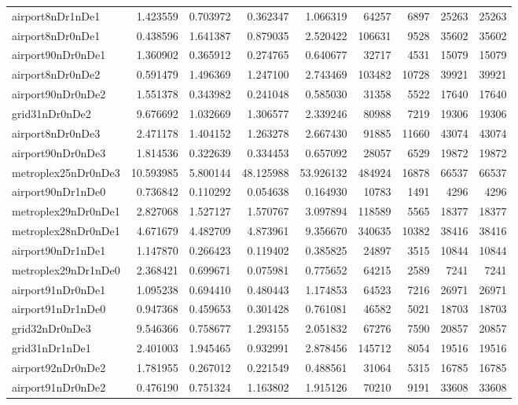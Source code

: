 \begin{longtable}{|l|r|r|r|r|r|r|r|r|}
airport8nDr1nDe1 & 1.423559 & 0.703972 & 0.362347 & 1.066319 & 64257 & 6897 & 25263 & 25263 \\
airport8nDr0nDe1 & 0.438596 & 1.641387 & 0.879035 & 2.520422 & 106631 & 9528 & 35602 & 35602 \\
airport90nDr0nDe1 & 1.360902 & 0.365912 & 0.274765 & 0.640677 & 32717 & 4531 & 15079 & 15079 \\
airport8nDr0nDe2 & 0.591479 & 1.496369 & 1.247100 & 2.743469 & 103482 & 10728 & 39921 & 39921 \\
airport90nDr0nDe2 & 1.551378 & 0.343982 & 0.241048 & 0.585030 & 31358 & 5522 & 17640 & 17640 \\
grid31nDr0nDe2 & 9.676692 & 1.032669 & 1.306577 & 2.339246 & 80988 & 7219 & 19306 & 19306 \\
airport8nDr0nDe3 & 2.471178 & 1.404152 & 1.263278 & 2.667430 & 91885 & 11660 & 43074 & 43074 \\
airport90nDr0nDe3 & 1.814536 & 0.322639 & 0.334453 & 0.657092 & 28057 & 6529 & 19872 & 19872 \\
metroplex25nDr0nDe3 & 10.593985 & 5.800144 & 48.125988 & 53.926132 & 484924 & 16878 & 66537 & 66537 \\
airport90nDr1nDe0 & 0.736842 & 0.110292 & 0.054638 & 0.164930 & 10783 & 1491 & 4296 & 4296 \\
metroplex29nDr0nDe1 & 2.827068 & 1.527127 & 1.570767 & 3.097894 & 118589 & 5565 & 18377 & 18377 \\
metroplex28nDr0nDe1 & 4.671679 & 4.482709 & 4.873961 & 9.356670 & 340635 & 10382 & 38416 & 38416 \\
airport90nDr1nDe1 & 1.147870 & 0.266423 & 0.119402 & 0.385825 & 24897 & 3515 & 10844 & 10844 \\
metroplex29nDr1nDe0 & 2.368421 & 0.699671 & 0.075981 & 0.775652 & 64215 & 2589 & 7241 & 7241 \\
airport91nDr0nDe1 & 1.095238 & 0.694410 & 0.480443 & 1.174853 & 64523 & 7216 & 26971 & 26971 \\
airport91nDr1nDe0 & 0.947368 & 0.459653 & 0.301428 & 0.761081 & 46582 & 5021 & 18703 & 18703 \\
grid32nDr0nDe3 & 9.546366 & 0.758677 & 1.293155 & 2.051832 & 67276 & 7590 & 20857 & 20857 \\
grid31nDr1nDe1 & 2.401003 & 1.945465 & 0.932991 & 2.878456 & 145712 & 8054 & 19516 & 19516 \\
airport92nDr0nDe2 & 1.781955 & 0.267012 & 0.221549 & 0.488561 & 31064 & 5315 & 16785 & 16785 \\
airport91nDr0nDe2 & 0.476190 & 0.751324 & 1.163802 & 1.915126 & 70210 & 9191 & 33608 & 33608 \\

\end{longtable}

